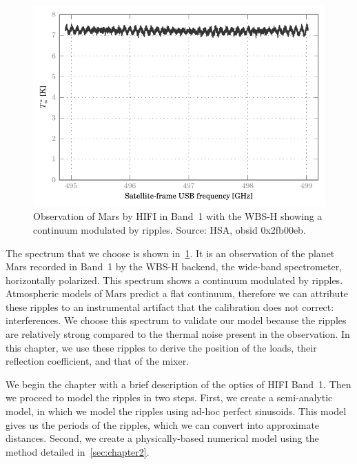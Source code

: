 \begin{figure}
    \centering
    \includegraphics{mars_25_original}
    \caption{Observation of Mars by HIFI in Band~1 with the WBS-H showing a continuum modulated by ripples.
    Source: HSA, obsid 0x2fb00eb.}
    \label{fig:mars_25_original}
\end{figure}

The spectrum that we choose is shown in~\cref{fig:mars_25_original}.
It is an observation of the planet Mars recorded in Band~1 by the WBS-H backend, the wide-band spectrometer, horizontally polarized.
This spectrum shows a continuum modulated by ripples.
Atmospheric models of Mars predict a flat continuum, therefore we can attribute these ripples to an instrumental artifact that the calibration does not correct: interferences.
We choose this spectrum to validate our model because the ripples are relatively strong compared to the thermal noise present in the observation.
In this chapter, we use these ripples to derive the position of the loads, their reflection coefficient, and that of the mixer.

We begin the chapter with a brief description of the optics of HIFI Band~1.
Then we proceed to model the ripples in two steps.
First, we create a semi-analytic model, in which we model the ripples using ad-hoc perfect sinusoids.
This model gives us the periods of the ripples, which we can convert into approximate distances.
Second, we create a physically-based numerical model using the method detailed in~\cref{sec:chapter2}.


\FloatBarrier



